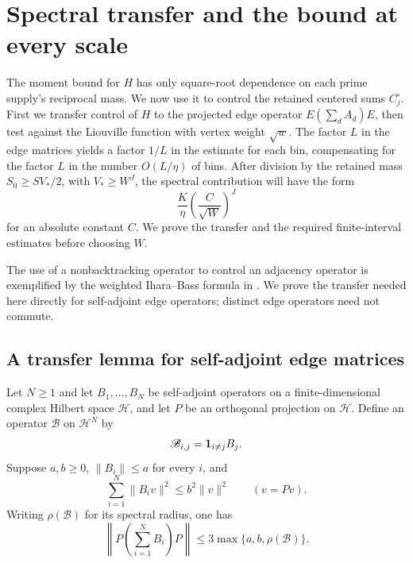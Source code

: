\section{Spectral transfer and the bound at every scale}
\label{q:sec-spectral}

The moment bound for $H$ has only square-root dependence on each
prime supply's reciprocal mass. We now use it to control the retained
centered sums $C_j^\circ$. First we transfer control of $H$ to the
projected edge operator $E(\sum_d A_d)E$, then test against the
Liouville function with vertex weight $\sqrt w$. The factor $L$ in
the edge matrices yields a factor $1/L$ in the estimate for each bin,
compensating for the factor $L$ in the number $O(L/\eta)$ of bins.
After division by the retained mass $S_0\ge SV_*/2$, with $V_*\ge W^J$,
the spectral contribution will have the form
\[
 \frac K\eta\left(\frac C{\sqrt W}\right)^J
\]
for an absolute constant $C$. We prove the transfer and the required
finite-interval estimates before choosing $W$.

The use of a nonbacktracking operator to control an adjacency operator
is exemplified by the weighted Ihara--Bass formula in
\cite[Section~4.2]{Pilatte26}.  We prove the transfer needed here
directly for self-adjoint edge operators; distinct edge operators need
not commute.

\subsection{A transfer lemma for self-adjoint edge matrices}

\begin{lemma}\label{q:noncommuting}
Let $N\ge1$ and let $B_1,\ldots,B_N$ be self-adjoint operators on a finite-dimensional
complex Hilbert space $\mathcal H$, and let $P$ be an orthogonal
projection on $\mathcal H$. Define an operator $\mathscr B$ on
$\mathcal H^N$ by
\[
 \mathscr B_{i,j}=\mathbf 1_{i\ne j}B_j.
\]
Suppose $a,b\ge0$, $\|B_i\|\le a$ for every $i$, and
\[
 \sum_{i=1}^N\|B_i v\|^2\le b^2\|v\|^2
 \qquad(v=Pv).
\]
Writing $\rho(\mathscr B)$ for its spectral radius, one has
\begin{equation}\label{q:noncommuting-bound}
 \left\|P\left(\sum_{i=1}^N B_i\right)P\right\|
 \le 3\max\{a,b,\rho(\mathscr B)\}.
\end{equation}
\end{lemma}

